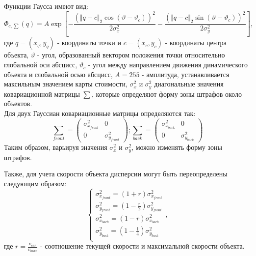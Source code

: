 Функции Гаусса имеют вид:
\begin{equation}
    \Phi_{c, \sum}(q) = A \exp[-\frac{(\Vert q-c \Vert_2 \cos(\vartheta - \vartheta_c))^2}{2\sigma^2_x} - \frac{(\Vert q-c \Vert_2 \sin(\vartheta - \vartheta_c))^2}{2\sigma^2_y}],
\end{equation}
где $q=(x_q,y_q)$ - координаты точки и $c=(x_c,y_c)$ - координаты центра объекта, $\vartheta$ - угол, образованный вектором положения точки относительно глобальной оси абсцисс, $\vartheta_c$ - угол между направлением движения динамического объекта и глобальной осью абсцисс, $A = 255$ - амплитуда, устанавливается максильным значением карты стоимости, $\sigma^2_x$ и $\sigma^2_y$ диагональные значения ковариационной матрицы $\sum$, которые определяют форму зоны штрафов около объектов. \\
Для двух Гауссиан ковариационные матрицы определяются так:
\begin{equation}
    \sum_{front} = \begin{pmatrix}
        \sigma^2_{x_{front}} & 0 \\
        0 & \sigma^2_{y_{front}}
    \end{pmatrix}; \sum_{back} = \begin{pmatrix}
        \sigma^2_{x_{back}} & 0 \\
        0 & \sigma^2_{y_{back}}
    \end{pmatrix}
\end{equation}
Таким образом, варьируя значения $\sigma^2_x$ и $\sigma^2_y$, можно изменять форму зоны штрафов. 

Также, для учета скорости объекта дисперсии могут быть переопределены следующим образом:
\begin{equation}
    \begin{cases}
        \sigma^2_{x_{front}} = (1+r)\sigma^2_{x_{front}} \\
        \sigma^2_{y_{front}} = (1-\frac{r}{2})\sigma^2_{y_{front}} \\
        \sigma^2_{x_{back}} = (1-r)\sigma^2_{x_{back}} \\
        \sigma^2_{y_{back}} = (1-\frac{1}{4})\sigma^2_{y_{back}} \\
    \end{cases},
\end{equation}
где $r = \frac{v_{cur}}{v_{max}}$ - соотношение текущей скорости и максимальной скорости объекта.

